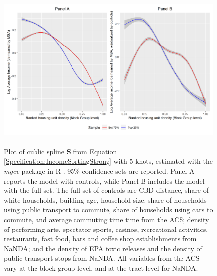 \documentclass[12pt]{article}
\begin{document}
		\begin{figure}[htbp!]
		\begin{center}
			\includegraphics[width=\textwidth]{income_combined.png}
			\caption{ \\ Plot of cublic spline $\mathbf{S}$ from Equation \eqref{Specification:IncomeSortingStrong} with 5 knots, estimated with the \textit{mgcv} package in R \citep{gampackage}. 95\% confidence sets are reported. Panel A reports the model with  controls, while Panel B includes the model with the full set. The full set of controls are CBD distance, share of white households, building age, household size, share of households using public transport to commute, share of households using cars to commute, and average commuting time time from the ACS; density of performing arts, spectator sports, casinos, recreational activities, restaurants, fast food, bars and coffee shop establishments from NaNDA; and the density of EPA toxic releases and the density of public transport stops from NaNDA. All variables from the ACS vary at the block group level, and at the tract level for NaNDA.  }\label{Figure:IncomeSortingStrong}
		\end{center}
	\end{figure}
	
\end{document}
